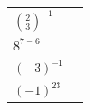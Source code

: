 {{\begin{center}
\begin{tabular}[t]{|l|l|}
                  \begin{math}{\left(\frac{2}{3}\right)}^{-1}\end{math}
                 &
     \tabularnewline\cline{1-1}\cline{2-2}
                  \begin{math}{8}^{7-6}\end{math}
                 &
     \tabularnewline\cline{1-1}\cline{2-2}
                  \begin{math}{\left(-3\right)}^{-1}\end{math}
                 &
     \tabularnewline\cline{1-1}\cline{2-2}
                  \begin{math}{\left(-1\right)}^{23}\end{math}
                 &

\end{tabular}
\end{center}}}
